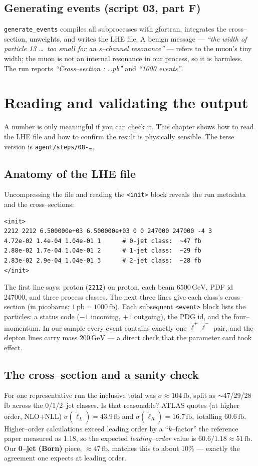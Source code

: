 \documentclass[11pt,oneside]{report}
\newcommand{\code}[1]{\texttt{#1}}
\newcommand{\slep}{\tilde{\ell}}
\newcommand{\fb}{\,\text{fb}}
\newcommand{\GeV}{\,\text{GeV}}
\begin{document}
\section{Generating events (script 03, part F)}
\code{generate\_events} compiles all subprocesses with gfortran, integrates the cross--section,
unweights, and writes the LHE file. A benign message --- \emph{``the width of particle 13
\dots\ too small for an s--channel resonance''} --- refers to the muon's tiny width; the muon is not
an internal resonance in our process, so it is harmless. The run reports
\emph{``Cross--section : \dots pb''} and \emph{``1000 events''}.

\chapter{Reading and validating the output}
\label{ch:output}

A number is only meaningful if you can check it. This chapter shows how to read the LHE file and how
to confirm the result is physically sensible. The terse version is \code{agent/steps/08-\dots}.

\section{Anatomy of the LHE file}
Uncompressing the file and reading the \code{<init>} block reveals the run metadata and the
cross--sections:
\begin{lstlisting}[style=card]
<init>
2212 2212 6.500000e+03 6.500000e+03 0 0 247000 247000 -4 3
4.72e-02 1.4e-04 1.04e-01 1      # 0-jet class:  ~47 fb
2.88e-02 1.7e-04 1.04e-01 2      # 1-jet class:  ~29 fb
2.83e-02 2.9e-04 1.04e-01 3      # 2-jet class:  ~28 fb
</init>
\end{lstlisting}
The first line says: proton (\code{2212}) on proton, each beam $6500\GeV$, PDF id 247000, and three
process classes. The next three lines give each class's cross--section (in picobarns; $1\,\text{pb}=
1000\fb$). Each subsequent \code{<event>} block lists the particles: a status code ($-1$ incoming,
$+1$ outgoing), the PDG id, and the four--momentum. In our sample every event contains exactly one
$\slep^{+}\slep^{-}$ pair, and the slepton lines carry mass $200\GeV$ --- a direct check that the
parameter card took effect.

\section{The cross--section and a sanity check}
For one representative run the inclusive total was $\sigma \approx 104\fb$, split as $\sim$47/29/28
fb across the 0/1/2--jet classes. Is that reasonable? ATLAS quotes (at higher order, NLO+NLL)
$\sigma(\slep_L)=43.9\fb$ and $\sigma(\slep_R)=16.7\fb$, totalling $60.6\fb$. Higher--order
calculations exceed leading order by a ``$k$--factor'' the reference paper measured as 1.18, so the
expected \emph{leading--order} value is $60.6/1.18 \approx 51\fb$. Our \textbf{0--jet (Born)} piece,
$\approx 47\fb$, matches this to about 10\% --- exactly the agreement one expects at leading order.
\end{document}
